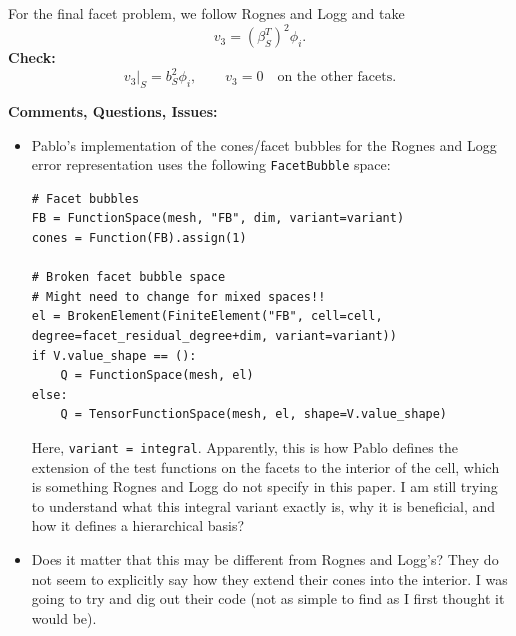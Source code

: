 \documentclass[12pt,a4paper]{article}
\begin{document}
\begin{itemize}

\end{itemize}


For the final facet problem, we follow Rognes and Logg and take
\begin{equation}
    v_3=(\beta_S^T)^2\phi_i.
\end{equation}
\textbf{Check:}
\begin{equation}
    v_3|_S=b_S^2\phi_i,
    \qquad v_3=0\quad\text{on the other facets}.
\end{equation}



\textbf{Comments, Questions, Issues:}

\begin{itemize}
    \item Pablo's implementation of the cones/facet bubbles for the Rognes and Logg error representation uses the following \texttt{FacetBubble} space: 
\begin{lstlisting}
# Facet bubbles
FB = FunctionSpace(mesh, "FB", dim, variant=variant)
cones = Function(FB).assign(1)

# Broken facet bubble space
# Might need to change for mixed spaces!!
el = BrokenElement(FiniteElement("FB", cell=cell, degree=facet_residual_degree+dim, variant=variant))
if V.value_shape == ():
    Q = FunctionSpace(mesh, el)
else:
    Q = TensorFunctionSpace(mesh, el, shape=V.value_shape)
\end{lstlisting}
Here, \texttt{variant = integral}. Apparently, this is how Pablo defines the extension of the test functions on the facets to the interior of the cell, which is something Rognes and Logg do not specify in this paper. I am still trying to understand what this integral variant exactly is, why it is beneficial, and how it defines a hierarchical basis? 

\item Does it matter that this may be different from Rognes and Logg's? They do not seem to explicitly say how they extend their cones into the interior. I was going to try and dig out their code (not as simple to find as I first thought it would be). 

\end{itemize}
\end{document}
